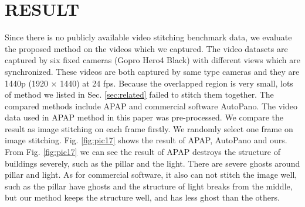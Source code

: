 \documentclass[conference]{IEEEtran}
\begin{document}
\section{RESULT}
\label{sec:result}

Since there is no publicly available video stitching benchmark data, we evaluate the proposed method on the 
videos which we captured.  The video datasets are captured by six fixed cameras (Gopro Hero4 Black) with different views which are synchronized. 
These videos are both captured by same type cameras and they are 1440p (1920 $\times$ 1440) at 24 fps.
Because the overlapped region is very small, lots of method we listed in Sec. \ref{sec:related} failed to stitch them together.
The compared methods include APAP and commercial software AutoPano. The video data used in APAP method in this paper was pre-processed. We compare the result as image stitching on each frame firstly.
We randomly select one frame on image stitching. Fig. \ref{fig:pic17} shows the result of APAP, AutoPano and ours. 
From Fig. \ref{fig:pic17} we can see the result of APAP 
destroys the structure of buildings severely, such as the pillar and the light. There are severe ghosts around pillar and light.
As for commercial software, it also can not stitch the image well, such as the pillar have ghosts and the structure of light breaks from the middle, 
but our method keeps the structure well, and has less ghost than the others.
\end{document}
